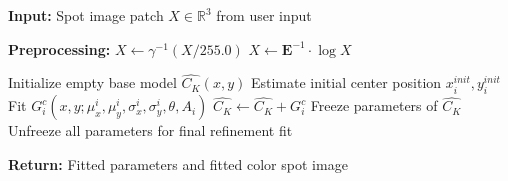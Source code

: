 \begin{spacing}{1.5}
\begin{algorithm}
\begin{algorithmic}[1]
    \State \textbf{Input:} Spot image patch $X\in\mathbb{R}^3$ from user input
    
    \State \textbf{Preprocessing:}
        \State $X \gets \gamma^{-1}(X/255.0)$ 
        \State $X \gets \mathbf{E}^{-1}\cdot\log{X}$ 
    
        \State Initialize empty base model $\hat{C_K}(x, y)$
            \State Estimate initial center position $x^{init}_i, y^{init}_i$
            \State Fit $G_i^c(x, y; \mu_x^i, \mu_y^i, \sigma_x^i, \sigma_y^i, \theta, A_i)$
            \State $\hat{C_K} \gets \hat{C_K}+G_i^c$
            \State Freeze parameters of $\hat{C_K}$
        \EndFor
        \State Unfreeze all parameters for final refinement fit
    \EndFor
    
    \State \textbf{Return:} Fitted parameters and fitted color spot image
    
    \end{algorithmic}
    \end{algorithm}

\end{spacing}
\newpage
